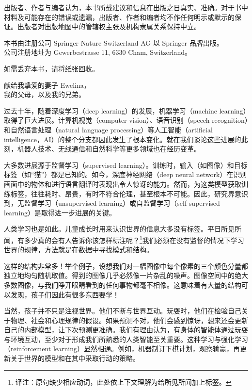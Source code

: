 出版者、作者与编者认为，本书所载建议和信息在出版之日真实、准确。对于书中材料及可能存在的错误或遗漏，出版者、作者和编者均不作任何明示或默示的保证。出版者对出版地图中的管辖权主张及机构隶属关系保持中立。

本书由注册公司 Springer Nature Switzerland AG 以 Springer 品牌出版。\\
公司注册地址为 Gewerbestrasse 11, 6330 Cham, Switzerland。

如需丢弃本书，请将纸张回收。
\endgroup
\clearpage

\thispagestyle{empty}
\vspace*{7em}
\begin{flushright}
献给我挚爱的妻子 Ewelina，\\
我的父母，以及我的兄弟。
\end{flushright}
\clearpage

过去十年，随着深度学习（deep learning）的发展，机器学习（machine learning）取得了巨大进展。计算机视觉（computer vision）、语音识别（speech recognition）和自然语言处理（natural language processing）等人工智能（artificial intelligence，AI）的整个分支都因此发生了根本变化。就在我们谈论这些进展的此刻，机器人技术、无线通信和自然科学等更多领域也在经历变革。

大多数进展源于监督学习（supervised learning）。训练时，输入（如图像）和目标标签（如“猫”）都是已知的。如今，深度神经网络（deep neural network）在识别画面中的物体和进行语言翻译时表现出令人惊讶的能力。然而，为这类模型获取训练标签，往往耗时、昂贵，有时不符合伦理，甚至根本不可能。因此，研究界意识到，无监督学习（unsupervised learning）或自监督学习（self-supervised learning）是取得进一步进展的关键。

人类学习也是如此。儿童成长时用来认识世界的信息大多没有标签。平日所见所闻，有多少真的会有人告诉你该怎样标注呢？\footnote{译注：原句缺少相应动词，此处依上下文理解为给所见所闻加上标签。}我们必须在没有监督的情况下学习世界的规律，方法就是在数据中寻找模式和结构。

这样的结构非常多！举个例子，设想我们对一幅图像中每个像素的三个颜色分量都独立地均匀随机取值。得到的图像几乎必然像一片杂乱的噪声。图像空间中的绝大多数图像，与我们睁开眼睛看到的任何事物都毫不相像。这意味着有大量的结构可以发现，孩子们因此有很多东西要学！

当然，孩子并不只是注视世界。他们不断与世界互动。玩耍时，他们在检验自己关于物理、社会和心理规律的假设。如果预测不对，他们会感到惊讶，想来还会更新自己的内部模型，让下次预测更准确。我们有理由认为，有身体的智能体通过玩耍与环境互动，至少对于形成我们所熟悉的人类智能至关重要。这种学习与强化学习（reinforcement learning）显然相通。例如，机器制订下棋计划，观察输赢，再更新关于世界的模型和在其中采取行动的策略。

